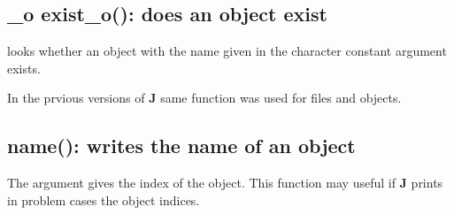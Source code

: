 \subsection{_o exist\_o(): does an object exist}
\label{exist}
looks whether an object with the name given in
the character constant  argument exists.
\begin{note}
In the prvious versions of \textbf{J} same function was used for files and objects.
\end{note}
\subsection{\textcolor{VioletRed}{name}(): writes the name of an object}
\label{name}
The argument gives the index of the object. This function
may useful if \textbf{J} prints in problem cases the object indices.
